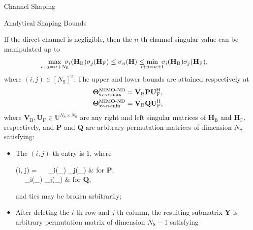 \documentclass[journal]{IEEEtran}
\begin{document}
\begin{section}{Channel Shaping}
\begin{subsection}{Analytical Shaping Bounds}
		\begin{corollary}
			\label{co:nd_sv_indl}
			If the direct channel is negligible,
			then the $n$-th channel singular value can be manipulated up to
			\begin{equation}
				\label{iq:sv_nd_indl}
				\max_{\mathclap{i+j=n+N_\mathrm{S}}} \ \sigma_i(\mathbf{H}_\mathrm{B}) \sigma_j(\mathbf{H}_\mathrm{F}) \le \sigma_n(\mathbf{H}) \le \min_{\mathclap{i+j=n+1}} \ \sigma_i(\mathbf{H}_\mathrm{B}) \sigma_j(\mathbf{H}_\mathrm{F}),
			\end{equation}
			where $(i, j) \in [N_\mathrm{S}]^2$.
			The upper and lower bounds are attained respectively at
			\begin{subequations}
				\label{eq:ris_nd_sv_indl}
				\begin{align}
					\mathbf{\Theta}_{\textnormal{sv-}n\textnormal{-max}}^\textnormal{MIMO-ND} & = \mathbf{V}_\mathrm{B} \mathbf{P} \mathbf{U}_\mathrm{F}^\mathsf{H}, \label{eq:ris_nd_sv_indl_max} \\
					\mathbf{\Theta}_{\textnormal{sv-}n\textnormal{-min}}^\textnormal{MIMO-ND} & = \mathbf{V}_\mathrm{B} \mathbf{Q} \mathbf{U}_\mathrm{F}^\mathsf{H}, \label{eq:ris_nd_sv_indl_min}
				\end{align}
			\end{subequations}
			where $\mathbf{V}_\mathrm{B}, \mathbf{U}_\mathrm{F} \in \mathbb{U}^{N_\mathrm{S} \times N_\mathrm{S}}$ are any right and left singular matrices of $\mathbf{H}_\mathrm{B}$ and $\mathbf{H}_\mathrm{F}$, respectively,
			and $\mathbf{P}$ and $\mathbf{Q}$ are arbitrary permutation matrices of dimension $N_\mathrm{S}$ satisfying:
			\begin{itemize}
				\item The $(i, j)$-th entry is $1$, where
					\begin{subnumcases}{(i, j) =}
						\  \ \sigma_i(\mathbf{H}_) \sigma_j(_) & for $\mathbf{P}$, \label{eq:idx_nd_sv_indl_max} \\
						\  \ \sigma_i(\mathbf{H}_) \sigma_j(_) & for $\mathbf{Q}$, \label{eq:idx_nd_sv_indl_min}
					\end{subnumcases}
					and ties may be broken arbitrarily;
				\item After deleting the $i$-th row and $j$-th column, the resulting submatrix $\mathbf{Y}$ is arbitrary permutation matrix of dimension $N_\mathrm{S}-1$ satisfying

\end{itemize}
\end{corollary}
\end{subsection}
\end{section}
\end{document}
